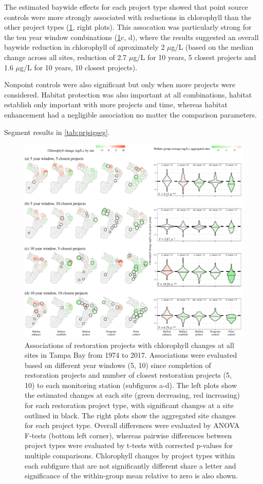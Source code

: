 \documentclass[]{article}
\begin{document}
The estimated baywide effects for each project type showed that point
source controls were more strongly associated with reductions in
chlorophyll than the other project types (\cref{fig:prjsig}, right
plots). This assocation was particularly strong for the ten year window
combinations (\cref{fig:prjsig}c, d), where the results suggested an
overall baywide reduction in chlorophyll of aproximately 2 \(\mu\)g/L
(based on the median change across all sites, reduction of 2.7
\(\mu\)g/L for 10 years, 5 closest projects and 1.6 \(\mu\)g/L for 10
years, 10 closest projects).

Nonpoint controls were also significant but only when more projects were
considered. Habitat protection was also important at all combinations,
habitat establish only important with more projects and time, whereas
habitat enhancement had a negligible association no matter the
comparison parameters.

Segment results in \cref{tab:prjsigseg}.

\begin{figure}
\includegraphics[width=1\linewidth]{figs/prjsig} \caption{Associations of restoration projects with chlorophyll changes at all sites in Tampa Bay from 1974 to 2017.  Associations were evaluated based on different year windows (5, 10) since completion of restoration projects and number of closest restoration projects (5, 10) to each monitoring station (subfigures a-d).  The left plots show the estimated changes at each site (green decreasing, red increasing) for each restoration project type, with significant changes at a site outlined in black.  The right plots show the aggregated site changes for each project type.  Overall differences were evaluated by ANOVA F-tests (bottom left corner), whereas pairwise differences between project types were evaluated by t-tests with corrected p-values for multiple comparisons.  Chlorophyll changes by project types within each subfigure that are not significantly different share a letter and significance of the within-group mean relative to zero is also shown.}\label{fig:prjsig}
\end{figure}
\end{document}
